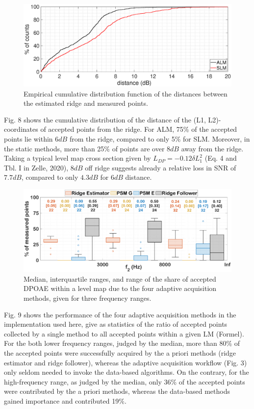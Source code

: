\documentclass[journal,twoside,web]{ieeecolor2}
\begin{document}
\begin{figure}[ht]
\centerline{\includegraphics[width=\columnwidth]{Fig_9_Cumula.eps}}
\caption{Empirical cumulative distribution function of the distances between the estimated ridge and measured points.}
\label{fig_CDF}
\end{figure}

Fig. 8 shows the cumulative distribution of the distance of the (L1, L2)-coordinates of accepted points from the ridge. For ALM, 75\% of the accepted points lie within $6 dB$ from the ridge, compared to only 5\% for SLM. Moreover, in the static methods, more than 25\% of points are over $8 dB$ away from the ridge. Taking a typical level map cross section given by $L_{DP} =-0.12 \delta L_1^2$ (Eq. 4 and Tbl. I in Zelle, 2020), $8 dB$ off ridge suggests already a relative loss in SNR of $7.7 dB$, compared to only $4.3 dB$ for $6 dB$ distance.

\begin{figure}[ht]
\centerline{\includegraphics[width=\columnwidth]{Fig_10_Boxplots.eps}}
\caption{Median, interquartile ranges, and range of the share of accepted DPOAE within a level map due to the four adaptive acquisition methods, given for three frequency ranges.}
\label{fig_BXP}
\end{figure}

Fig. 9 shows the performance of the four adaptive acquisition methods in the implementation used here, give as statistics of the ratio of accepted points collected by a single method to all accepted points within a given LM (Formel). For the both lower frequency ranges, judged by the median, more than 80\% of the accepted points were successfully acquired by the a priori methods (ridge estimator and ridge follower), whereas the adaptive acquisition workflow (Fig. 3) only seldom needed to invoke the data-based algorithms. On the contrary, for the high-frequency range, as judged by the median, only 36\% of the accepted points were contributed by the a priori methods, whereas the data-based methods gained importance and contributed 19\%.
\end{document}
